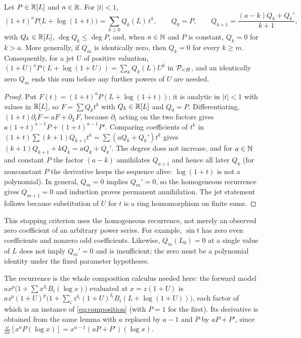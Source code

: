 \begin{lemma}
\label{lem:composition}
Let $P\in\mathbb R[L]$ and $a\in\mathbb R$. For $|t|<1$,
\begin{equation}
 (1+t)^aP\bigl(L+\log(1+t)\bigr)=\sum_{k\ge0}Q_k(L)\,t^k,\qquad
 Q_0=P,\qquad Q_{k+1}=\frac{(a-k)Q_k+Q_k'}{k+1},
 \label{eq:composition}
\end{equation}
with $Q_k\in\mathbb R[L]$, $\deg Q_k\le\deg P$, and, when $a\in\mathbb N$ and $P$ is constant, $Q_k=0$ for $k>a$. More generally, if $Q_m$ is identically zero, then $Q_k=0$ for every $k\ge m$. Consequently, for a jet $U$ of positive valuation, $(1+U)^aP(L+\log(1+U))=\sum_kQ_k(L)U^k$ in $\mathcal P_{<H}$, and an identically zero $Q_m$ ends this sum before any further powers of $U$ are needed.
\end{lemma}
\begin{proof}
Put $F(t)=(1+t)^aP(L+\log(1+t))$; it is analytic in $|t|<1$ with values in $\mathbb R[L]$, so $F=\sum Q_kt^k$ with $Q_k\in\mathbb R[L]$ and $Q_0=P$. Differentiating, $(1+t)\partial_tF=aF+\partial_LF$, because $\partial_t$ acting on the two factors gives $a(1+t)^{a-1}P+(1+t)^{a-1}P'$. Comparing coefficients of $t^k$ in $(1+t)\sum(k+1)Q_{k+1}t^k=\sum(aQ_k+Q_k')t^k$ gives $(k+1)Q_{k+1}+kQ_k=aQ_k+Q_k'$. The degree does not increase, and for $a\in\mathbb N$ and constant $P$ the factor $(a-k)$ annihilates $Q_{a+1}$ and hence all later $Q_k$ (for nonconstant $P$ the derivative keeps the sequence alive: $\log(1+t)$ is not a polynomial). In general, $Q_m=0$ implies $Q_m'=0$, so the homogeneous recurrence gives $Q_{m+1}=0$ and induction proves permanent annihilation. The jet statement follows because substitution of $U$ for $t$ is a ring homomorphism on finite sums.
\end{proof}

This stopping criterion uses the homogeneous recurrence, not merely an
observed zero coefficient of an arbitrary power series. For example,
$\sin t$ has zero even coefficients and nonzero odd coefficients. Likewise,
$Q_m(L_0)=0$ at a single value of $L$ does not imply $Q_m'=0$ and is
insufficient; the zero must be a polynomial identity under the fixed
parameter hypotheses.

\begin{remark}
The recurrence is the whole composition calculus needed here: the forward model $ax^p\bigl(1+\sum x^{\delta_i}B_i(\log x)\bigr)$ evaluated at $x=z(1+U)$ is
$az^p(1+U)^p\bigl(1+\sum_iz^{\delta_i}(1+U)^{\delta_i}B_i(L+\log(1+U))\bigr)$, each factor of which is an instance of \eqref{eq:composition} (with $P=1$ for the first). Its derivative is obtained from the same lemma with $a$ replaced by $a-1$ and $P$ by $aP+P'$, since $\frac{\dd}{\dd x}[x^aP(\log x)]=x^{a-1}(aP+P')(\log x)$.
\end{remark}

